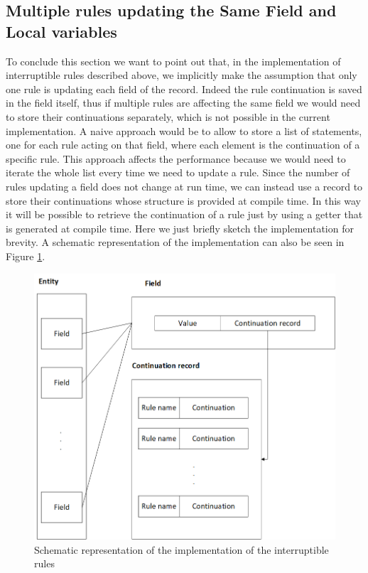 \subsection{Multiple rules updating the Same Field and Local variables}
To conclude this section we want to point out that, in the implementation of interruptible rules described above, we implicitly make the assumption that only one rule is updating each field of the record. Indeed the rule continuation is saved in the field itself, thus if multiple rules are affecting the same field we would need to store their continuations separately, which is not possible in the current implementation. A naive approach would be to allow to store a list of statements, one for each rule acting on that field, where each element is the continuation of a specific rule. This approach affects the performance because we would need to iterate the whole list every time we need to update a rule. Since the number of rules updating a field does not change at run time, we can instead use a record to store their continuations whose structure is provided at compile time. In this way it will be possible to retrieve the continuation of a rule just by using a getter that is generated at compile time. Here we just briefly sketch the implementation for brevity. A schematic representation of the implementation can also be seen in Figure \ref{fig:ch_networking_interruptible_rules}.

\begin{figure}
  \centering
  \includegraphics[width=\textwidth]{Figures/chapter_networking/interruptible_rules}
  \caption{Schematic representation of the implementation of the interruptible rules}
  \label{fig:ch_networking_interruptible_rules}
\end{figure}

